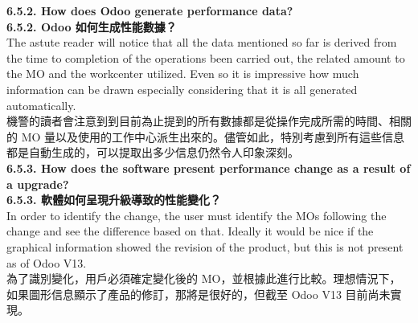 \documentclass[12pt,a4paper]{report}  %
\begin{document}
\Large\textbf{6.5.2. How does Odoo generate performance data?}\\
\Large\textbf{6.5.2. Odoo 如何生成性能數據？}\\

The astute reader will notice that all the data mentioned so far is derived from the time to completion of the operations been carried out, the related amount to the MO and the workcenter utilized. Even so it is impressive how much information can be drawn especially considering that it is all generated automatically.\\
機警的讀者會注意到到目前為止提到的所有數據都是從操作完成所需的時間、相關的 MO 量以及使用的工作中心派生出來的。儘管如此，特別考慮到所有這些信息都是自動生成的，可以提取出多少信息仍然令人印象深刻。\\

\Large\textbf{6.5.3. How does the software present performance change as a result of a upgrade?}\\
\Large\textbf{6.5.3. 軟體如何呈現升級導致的性能變化？}\\

In order to identify the change, the user must identify the MOs following the change and see the difference based on that. Ideally it would be nice if the graphical information showed the revision of the product, but this is not present as of Odoo V13.\\
為了識別變化，用戶必須確定變化後的 MO，並根據此進行比較。理想情況下，如果圖形信息顯示了產品的修訂，那將是很好的，但截至 Odoo V13 目前尚未實現。
\end{document}
